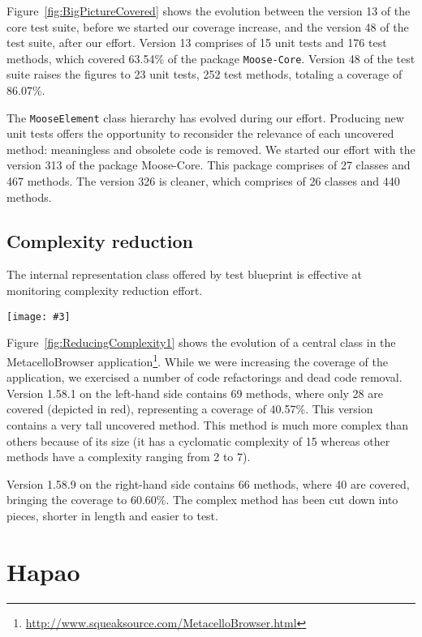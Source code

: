 \documentclass{sig-alternate}
\newcommand{\ct}{\lstinline[backgroundcolor=\color{white},basicstyle=\footnotesize\ttfamily]}
\newcommand{\largefig}[4]{
	\begin{figure*}[#1]
		\centering
		\texttt{[image: \#3]}
		\caption{\label{fig:#3}#4}
	\end{figure*}}
\newcommand{\seclabel}[1]{\label{sec:#1}}
\newcommand{\figref}[1]{Figure~\ref{fig:#1}}
\begin{document}
\figref{BigPictureCovered} shows the evolution between the version 13 of the core test suite, before we started our coverage increase, and the version 48 of the test suite, after our effort. Version 13 comprises of 15 unit tests and 176 test methods, which covered 63.54\% of the package \ct{Moose-Core}.  Version 48 of the test suite raises the figures to 23 unit tests, 252 test methods, totaling a coverage of 86.07\%.

The \ct{MooseElement} class hierarchy has evolved during our effort. Producing new unit tests offers the opportunity to reconsider the relevance of each uncovered method: meaningless and obsolete code is removed. We started our effort with the version 313 of the package Moose-Core. This package comprises of 27 classes and 467 methods. The version 326 is cleaner, which comprises of 26 classes and 440 methods.

\subsection{Complexity reduction}\seclabel{complexityReduction}

The internal representation class offered by test blueprint is effective at monitoring complexity reduction effort.

\largefig{}{0.5}{ReducingComplexity1}{Complexity reduction in MetacelloBrowser.}

\figref{ReducingComplexity1} shows the evolution of a central class in the MetacelloBrowser application\footnote{\url{http://www.squeaksource.com/MetacelloBrowser.html}}. While we were increasing the coverage of the application, we exercised a number of code refactorings and dead code removal. Version 1.58.1 on the left-hand side contains 69 methods, where only 28 are covered (depicted in red), representing a coverage of 40.57\%.  This version contains a very tall uncovered method. This method is much more complex than others because of its size (it has a cyclomatic complexity of 15 whereas other methods have a complexity ranging from 2 to 7). 

Version 1.58.9 on the right-hand side contains 66 methods, where 40 are covered, bringing the coverage to 60.60\%. The complex method has been cut down into pieces, shorter in length and easier to test. 


\section{Hapao}
\end{document}

